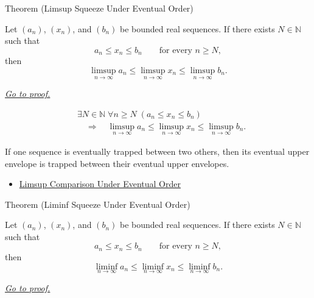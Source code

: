 
\begin{theorembox}{Theorem (Limsup Squeeze Under Eventual Order)}
\begin{theorem}
\label{thm:limsup-squeeze-under-eventual-order}
Let $(a_n)$, $(x_n)$, and $(b_n)$ be bounded real sequences. If there
exists $N\in\mathbb{N}$ such that
\[
  a_n\le x_n\le b_n
  \qquad\text{for every }n\ge N,
\]
then
\[
  \limsup_{n\to\infty}a_n
  \le
  \limsup_{n\to\infty}x_n
  \le
  \limsup_{n\to\infty}b_n.
\]

\smallskip
\noindent
\hyperref[prf:limsup-squeeze-under-eventual-order]{\textit{Go to proof.}}
\end{theorem}
\end{theorembox}

\begin{remark*}
\[
\begin{aligned}
&\exists N\in\mathbb{N}\;\forall n\ge N\;(a_n\le x_n\le b_n)\\
&\quad\Longrightarrow\quad
\limsup_{n\to\infty}a_n
\le
\limsup_{n\to\infty}x_n
\le
\limsup_{n\to\infty}b_n.
\end{aligned}
\]
\end{remark*}

\begin{remark*}[Interpretation]
If one sequence is eventually trapped between two others, then its eventual
upper envelope is trapped between their eventual upper envelopes.
\end{remark*}

\begin{dependencies}
\begin{itemize}
  \item \hyperref[thm:limsup-comparison-under-eventual-order]{Limsup Comparison Under Eventual Order}
\end{itemize}
\end{dependencies}


\begin{theorembox}{Theorem (Liminf Squeeze Under Eventual Order)}
\begin{theorem}
\label{thm:liminf-squeeze-under-eventual-order}
Let $(a_n)$, $(x_n)$, and $(b_n)$ be bounded real sequences. If there
exists $N\in\mathbb{N}$ such that
\[
  a_n\le x_n\le b_n
  \qquad\text{for every }n\ge N,
\]
then
\[
  \liminf_{n\to\infty}a_n
  \le
  \liminf_{n\to\infty}x_n
  \le
  \liminf_{n\to\infty}b_n.
\]

\smallskip
\noindent
\hyperref[prf:liminf-squeeze-under-eventual-order]{\textit{Go to proof.}}
\end{theorem}
\end{theorembox}


